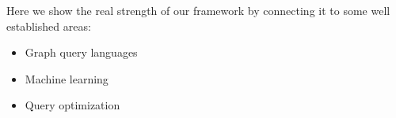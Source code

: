 Here we show the real strength of our framework by connecting it to some well established areas:

\begin{itemize}
\item Graph query languages
\item Machine learning
\item Query optimization
\end{itemize}